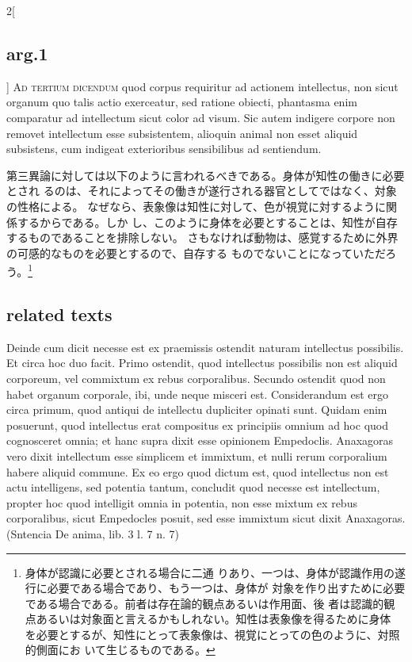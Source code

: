\documentclass[paper=a4paper,fontsize=10pt,jafontsize=9pt,titlepage]{jlreq}
\begin{document}
\begin{paracol}{2}[\subsection{arg.1}]
 {\scshape Ad tertium dicendum} quod corpus requiritur ad actionem intellectus,
 non sicut organum quo talis actio exerceatur, sed ratione obiecti, phantasma
 enim comparatur ad intellectum sicut color ad visum. Sic autem indigere corpore
 non removet intellectum esse subsistentem, alioquin animal non esset aliquid
 subsistens, cum indigeat exterioribus sensibilibus ad sentiendum.

\switchcolumn

 第三異論に対しては以下のように言われるべきである。身体が知性の働きに必要とされ
 るのは、それによってその働きが遂行される器官としてではなく、対象の性格による。
 なぜなら、表象像は知性に対して、色が視覚に対するように関係するからである。しか
 し、このように身体を必要とすることは、知性が自存するものであることを排除しない。
 さもなければ動物は、感覚するために外界の可感的なものを必要とするので、自存する
 ものでないことになっていただろう。\footnote{身体が認識に必要とされる場合に二通
 りあり、一つは、身体が認識作用の遂行に必要である場合であり、もう一つは、身体が
 対象を作り出すために必要である場合である。前者は存在論的観点あるいは作用面、後
 者は認識的観点あるいは対象面と言えるかもしれない。知性は表象像を得るために身体
 を必要とするが、知性にとって表象像は、視覚にとっての色のように、対照的側面にお
 いて生じるものである。}
\end{paracol}

\subsection{related texts}
 Deinde cum dicit necesse est ex praemissis ostendit naturam intellectus possibilis. Et circa hoc duo facit. Primo ostendit, quod intellectus possibilis non est aliquid corporeum, vel commixtum ex rebus corporalibus. Secundo ostendit quod non habet organum corporale, ibi, unde neque misceri est. Considerandum est ergo circa primum, quod antiqui de intellectu dupliciter opinati sunt. Quidam enim posuerunt, quod intellectus erat compositus ex principiis omnium ad hoc quod cognosceret omnia; et hanc supra dixit esse opinionem Empedoclis. Anaxagoras vero dixit intellectum esse simplicem et immixtum, et nulli rerum corporalium habere aliquid commune. Ex eo ergo quod dictum est, quod intellectus non est actu intelligens, sed potentia tantum, concludit quod necesse est intellectum, propter hoc quod intelligit omnia in potentia, non esse mixtum ex rebus corporalibus, sicut Empedocles posuit, sed esse immixtum sicut dixit Anaxagoras. (Sntencia De anima, lib. 3 l. 7 n. 7)
\end{document}
